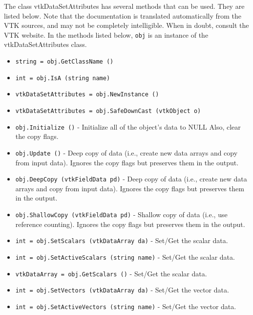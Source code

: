 The class vtkDataSetAttributes has several methods that can be used.
  They are listed below.
Note that the documentation is translated automatically from the VTK sources,
and may not be completely intelligible.  When in doubt, consult the VTK website.
In the methods listed below, \verb|obj| is an instance of the vtkDataSetAttributes class.
\begin{itemize}
\item  \verb|string = obj.GetClassName ()|

\item  \verb|int = obj.IsA (string name)|

\item  \verb|vtkDataSetAttributes = obj.NewInstance ()|

\item  \verb|vtkDataSetAttributes = obj.SafeDownCast (vtkObject o)|

\item  \verb|obj.Initialize ()| -  Initialize all of the object's data to NULL
 Also, clear the copy flags.

\item  \verb|obj.Update ()| -  Deep copy of data (i.e., create new data arrays and
 copy from input data). 
 Ignores the copy flags but preserves them in the output.

\item  \verb|obj.DeepCopy (vtkFieldData pd)| -  Deep copy of data (i.e., create new data arrays and
 copy from input data). 
 Ignores the copy flags but preserves them in the output.

\item  \verb|obj.ShallowCopy (vtkFieldData pd)| -  Shallow copy of data (i.e., use reference counting).
 Ignores the copy flags but preserves them in the output.

\item  \verb|int = obj.SetScalars (vtkDataArray da)| -  Set/Get the scalar data.

\item  \verb|int = obj.SetActiveScalars (string name)| -  Set/Get the scalar data.

\item  \verb|vtkDataArray = obj.GetScalars ()| -  Set/Get the scalar data.

\item  \verb|int = obj.SetVectors (vtkDataArray da)| -  Set/Get the vector data.

\item  \verb|int = obj.SetActiveVectors (string name)| -  Set/Get the vector data.


\end{itemize}
